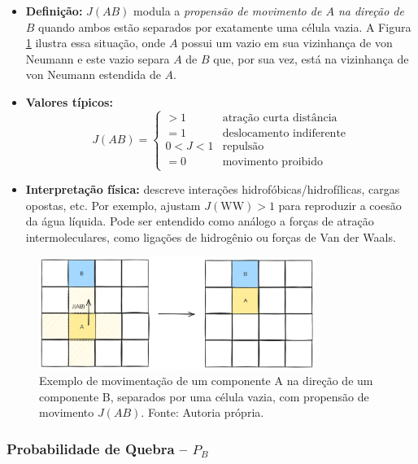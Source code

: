 \documentclass[12pt,oneside]{report}
\begin{document}
\begin{itemize}
    \item \textbf{Definição:} $J(AB)$ modula a
          \emph{propensão de movimento de $A$ na direção de $B$}
          quando ambos estão separados por exatamente uma célula vazia. A Figura \ref{fig:movimentacao_juncao} ilustra essa situação, onde $A$ possui um vazio em sua vizinhança de von Neumann e este vazio separa $A$ de $B$ que, por sua vez, está na vizinhança de von Neumann estendida de $A$.
    \item \textbf{Valores típicos:}
          \[
              J(AB)=
              \begin{cases}
                  >1    & \text{atração curta distância}  \\[2pt]
                  =1    & \text{deslocamento indiferente} \\[2pt]
                  0<J<1 & \text{repulsão}                 \\[2pt]
                  =0    & \text{movimento proibido}
              \end{cases}
          \]
    \item \textbf{Interpretação física:} descreve interações
          hidrofóbicas/hidrofílicas, cargas opostas, etc.
          Por exemplo, \citeauthor{kier2005} ajustam
          $J(\mathrm{WW})>1$ para reproduzir a coesão da água líquida. Pode ser entendido como análogo a forças de atração intermoleculares, como ligações de hidrogênio ou forças de Van der Waals.
\end{itemize}

\begin{figure}[H]
    \centering
    \includegraphics[width=0.8\textwidth]{img/Jab.png}
    \caption{\small Exemplo de movimentação de um componente A na direção de um componente B, separados por uma célula vazia, com propensão de movimento $J(AB)$. Fonte: Autoria própria.}
    \label{fig:movimentacao_juncao}
\end{figure}

\subsubsection{Probabilidade de Quebra – \texorpdfstring{$P_B$}{Pb}}
\label{subsubsec:Pb}
\end{document}
